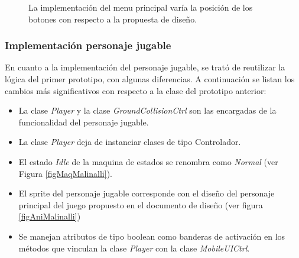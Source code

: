 \begin{figure}
  \centering
   
 	
  \caption{La implementación del menu principal varía la posición de los botones con respecto a la propuesta de diseño.}
  \label{figDisenioMenu}
\end{figure} 

\subsubsection{Implementación personaje jugable}
En cuanto a la implementación del personaje jugable, se trató de reutilizar la lógica 
del primer prototipo, con algunas diferencias. A continuación
se listan los cambios más significativos con respecto a la clase del prototipo anterior:
\begin{itemize}
	\item La clase \textit{Player} y la clase \textit{GroundCollisionCtrl} son las 
	encargadas de la funcionalidad del personaje jugable.
	\item La clase \textit{Player} deja de instanciar clases de tipo Controlador.
	\item El estado \textit{Idle} de la maquina de estados se renombra como
	 \textit{Normal} (ver Figura \ref{figMaqMalinalli}).
	 \item El sprite del personaje jugable corresponde con el diseño del personaje 
	 principal del juego propuesto en el documento de diseño (ver figura \ref{figAniMalinalli})
	 \item Se manejan atributos de tipo boolean como banderas de 
	 activación en los métodos que vinculan la clase \textit{Player} con la clase 
	 \textit{MobileUICtrl}.
\end{itemize}


